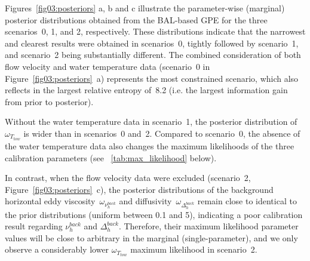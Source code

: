 \documentclass[draft,linenumbers,onecolumn]{agujournal2019} %
\begin{document}
Figures~\ref{fig03:posteriors} a, b and c illustrate the parameter-wise (marginal) posterior distributions obtained from the BAL-based GPE for the three scenarios~0, 1, and 2, respectively. These distributions indicate that the narrowest and clearest results were obtained in scenarios~0, tightly followed by scenario~1, and scenario~2 being substantially different. The combined consideration of both flow velocity and water temperature data (scenario~0 in Figure~\ref{fig03:posteriors}~a) represents the most constrained scenario, which also reflects in the largest relative entropy of~8.2 (i.e. the largest information gain from prior to posterior).

Without the water temperature data in scenario~1, the posterior distribution of \(\omega_{T_{tow}}\) is wider than in scenarios~0 and~2. Compared to scenario~0, the absence of the water temperature data also changes the maximum likelihoods of the three calibration parameters (see \tablename{~\ref{tab:max_likelihood}} below). 

In contrast, when the flow velocity data were excluded (scenario~2, Figure~\ref{fig03:posteriors}~c), the posterior distributions of the background horizontal eddy viscosity~\(\omega_{\nu_{h}^{back}}\) and diffusivity~\(\omega_{\Delta_{h}^{back}}\) remain close to identical to the prior distributions (uniform between 0.1 and 5), indicating a poor calibration result regarding $\nu_{h}^{back}$ and $\Delta_{h}^{back}$. Therefore, their maximum likelihood parameter values will be close to arbitrary in the marginal (single-parameter), and we only observe a considerably lower \(\omega_{T_{tow}}\) maximum likelihood in scenario~2.
\end{document}
